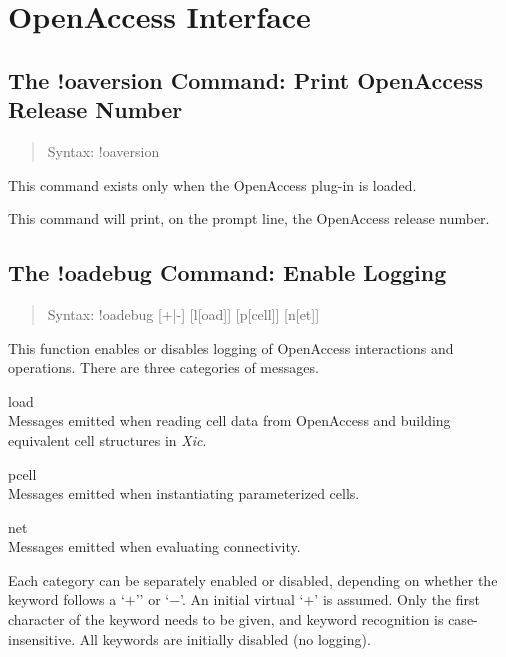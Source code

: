 \ifoa
\section{OpenAccess Interface}

\subsection{The {\cb !oaversion} Command: Print OpenAccess Release Number}
\begin{quote}
Syntax: {\vt !oaversion}
\end{quote}
This command exists only when the OpenAccess plug-in is loaded.

This command will print, on the prompt line, the OpenAccess release
number.

\subsection{The {\cb !oadebug} Command: Enable Logging}
\begin{quote}
Syntax: {\vt !oadebug} [{\vt +}{\vt |}{\vt -}] [{\vt l}[{\vt oad}]]
[{\vt p}[{\vt cell}]] [{\vt n}[{\vt et}]]
\end{quote}
This function enables or disables logging of OpenAccess interactions
and operations.  There are three categories of messages.

\begin{description}
\item{\vt load}\\
Messages emitted when reading cell data from OpenAccess and building
equivalent cell structures in {\it Xic}.

\item{\vt pcell}\\
Messages emitted when instantiating parameterized cells.

\item{\vt net}\\
Messages emitted when evaluating connectivity.
\end{description}

Each category can be separately enabled or disabled, depending on
whether the keyword follows a `$+$'' or `$-$'.  An initial virtual
`$+$' is assumed.  Only the first character of the keyword needs to be
given, and keyword recognition is case-insensitive.  All keywords are
initially disabled (no logging).

